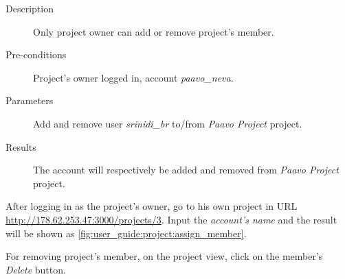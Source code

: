 \begin{description}
\item[Description] Only project owner can add or remove project's member.
\item[Pre-conditions] Project's owner logged in, \eg account \emph{paavo\_neva}.
\item[Parameters] Add and remove user \emph{srinidi\_br} to/from \emph{Paavo Project} project.
\item[Results] The account will respectively be added and removed from \emph{Paavo Project} project.
\end{description}

After logging in as the project's owner, go to his own project in URL \href{http://178.62.253.47:3000/projects/3}{http://178.62.253.47:3000/projects/3}.
Input the \emph{account's name} and the result will be shown as \autoref{fig:user_guide:project:assign_member}.

For removing project's member, on the project view, click on the member's \emph{Delete} button.

